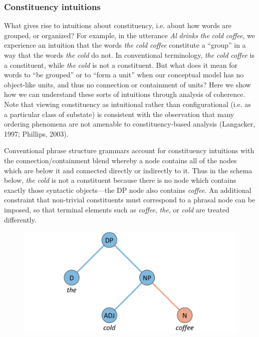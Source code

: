 \subsubsection{Constituency intuitions}

What gives rise to intuitions about constituency, i.e. about how words are grouped, or organized? For example, in the utterance \textit{Al} \textit{drinks} \textit{the} \textit{cold} \textit{coffee}, we experience an intuition that the words \textit{the} \textit{cold} \textit{coffee} constitute a “group” in a way that the words \textit{the} \textit{cold} do not. In conventional terminology, \textit{the} \textit{cold} \textit{coffee} is a constituent, while \textit{the} \textit{cold} is not a constituent. But what does it mean for words to “be grouped” or to “form a unit” when our conceptual model has no object-like units, and thus no connection or containment of units? Here we show how we can understand these sorts of intuitions through analysis of coherence. Note that viewing constituency as intuitional rather than configurational (i.e. as a particular class of substate) is consistent with the observation that many ordering phenomena are not amenable to constituency-based analysis (Langacker, 1997; Phillips, 2003).

  Conventional phrase structure grammars account for constituency intuitions with the connection/containment blend whereby a node contains all of the nodes which are below it and connected directly or indirectly to it. Thus in the schema below, \textit{the} \textit{cold} is not a constituent because there is no node which contains exactly those syntactic objects—the DP node also contains \textit{coffee}. An additional constraint that non-trivial constituents must correspond to a phrasal node can be imposed, so that terminal elements such as \textit{coffee}, \textit{the}, or \textit{cold} are treated differently. 

  
\begin{figure}
\includegraphics[width=\textwidth]{figures/Tilsen-img136.png}
\caption{\missingcaption}
\label{fig:}
\end{figure}
 


